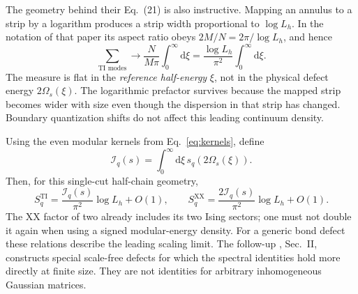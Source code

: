\documentclass[aps,prb,onecolumn,nofootinbib,superscriptaddress]{revtex4-2}
\newcommand{\dd}{\mathrm{d}}
\begin{document}
The geometry behind their Eq.~(21) is also instructive. Mapping an
annulus to a strip by a logarithm produces a strip width proportional to
$\log L_h$. In the notation of that paper its aspect ratio obeys
$2M/N=2\pi/\log L_h$, and hence
\begin{equation}
 \sum_{\text{TI modes}}\longrightarrow
 \frac{N}{M\pi}\int_0^\infty\dd\xi
 =\frac{\log L_h}{\pi^2}\int_0^\infty\dd\xi .
 \label{eq:defect-reference-measure}
\end{equation}
The measure is flat in the \emph{reference half-energy} $\xi$, not in
the physical defect energy $2\Omega_s(\xi)$. The logarithmic prefactor
survives because the mapped strip becomes wider with size even though
the dispersion in that strip has changed. Boundary quantization shifts
do not affect this leading continuum density.

Using the even modular kernels from Eq.~\eqref{eq:kernels}, define
\begin{equation}
 \mathcal I_q(s)=\int_0^\infty\dd\xi\,
                     s_q\!\left(2\Omega_s(\xi)\right).
 \label{eq:defect-renyi-integral}
\end{equation}
Then, for this single-cut half-chain geometry,
\begin{equation}
 S_q^{\mathrm{TI}}=\frac{\mathcal I_q(s)}{\pi^2}\log L_h+O(1),
 \qquad
 S_q^{\mathrm{XX}}=\frac{2\mathcal I_q(s)}{\pi^2}\log L_h+O(1).
 \label{eq:defect-entropies}
\end{equation}
The XX factor of two already includes its two Ising sectors; one must
not double it again when using a signed modular-energy density.
For a generic bond defect these relations describe the leading scaling
limit. The follow-up \cite{PeschelEisler2012}, Sec.~II, constructs
special scale-free defects for which the spectral identities hold more
directly at finite size. They are not identities for arbitrary
inhomogeneous Gaussian matrices.
\end{document}
